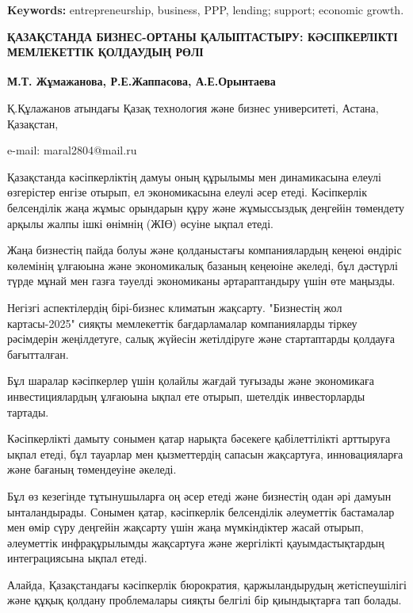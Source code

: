 {\bfseries Keywords:} entrepreneurship, business, PPP, lending; support;
economic growth.
\begin{articleheader}

{\bfseries ҚАЗАҚСТАНДА БИЗНЕС-ОРТАНЫ ҚАЛЫПТАСТЫРУ: КӘСІПКЕРЛІКТІ
МЕМЛЕКЕТТІК ҚОЛДАУДЫҢ РӨЛІ}

{\bfseries М.Т. Жұмажанова\textsuperscript{\envelope }, Р.Е.Жаппасова,
А.Е.Орынтаева}
\end{articleheader}
\begin{affiliation}

Қ.Құлажанов атындағы Қазақ технология және бизнес университеті, Астана,
Қазақстан,

e-mail: maral2804@mail.ru
\end{affiliation}

Қазақстанда кәсіпкерліктің дамуы оның құрылымы мен динамикасына елеулі
өзгерістер енгізе отырып, ел экономикасына елеулі әсер етеді.
Кәсіпкерлік белсенділік жаңа жұмыс орындарын құру және жұмыссыздық
деңгейін төмендету арқылы жалпы ішкі өнімнің (ЖІӨ) өсуіне ықпал етеді.

Жаңа бизнестің пайда болуы және қолданыстағы компаниялардың кеңеюі
өндіріс көлемінің ұлғаюына және экономикалық базаның кеңеюіне әкеледі,
бұл дәстүрлі түрде мұнай мен газға тәуелді экономиканы әртараптандыру
үшін өте маңызды.

Негізгі аспектілердің бірі-бизнес климатын жақсарту. "Бизнестің жол
картасы-2025" сияқты мемлекеттік бағдарламалар компанияларды тіркеу
рәсімдерін жеңілдетуге, салық жүйесін жетілдіруге және стартаптарды
қолдауға бағытталған.

Бұл шаралар кәсіпкерлер үшін қолайлы жағдай туғызады және экономикаға
инвестициялардың ұлғаюына ықпал ете отырып, шетелдік инвесторларды
тартады.

Кәсіпкерлікті дамыту сонымен қатар нарықта бәсекеге қабілеттілікті
арттыруға ықпал етеді, бұл тауарлар мен қызметтердің сапасын жақсартуға,
инновацияларға және бағаның төмендеуіне әкеледі.

Бұл өз кезегінде тұтынушыларға оң әсер етеді және бизнестің одан әрі
дамуын ынталандырады. Сонымен қатар, кәсіпкерлік белсенділік әлеуметтік
бастамалар мен өмір сүру деңгейін жақсарту үшін жаңа мүмкіндіктер жасай
отырып, әлеуметтік инфрақұрылымды жақсартуға және жергілікті
қауымдастықтардың интеграциясына ықпал етеді.

Алайда, Қазақстандағы кәсіпкерлік бюрократия, қаржыландырудың
жетіспеушілігі және құқық қолдану проблемалары сияқты белгілі бір
қиындықтарға тап болады.

